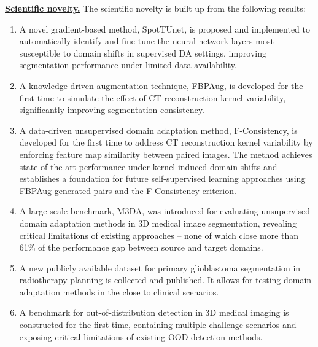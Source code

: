 \underline{\textbf{Scientific novelty.}}
The scientific novelty is built up from the following results:

\begin{enumerate}
	
	\item A novel gradient-based method, SpotTUnet, is proposed and implemented to automatically identify and fine-tune the neural network layers most susceptible to domain shifts in supervised DA settings, improving segmentation performance under limited data availability.
	
	\item A knowledge-driven augmentation technique, FBPAug, is developed for the first time to simulate the effect of CT reconstruction kernel variability, significantly improving segmentation consistency.
	
	\item A data-driven unsupervised domain adaptation method, F-Consistency, is developed for the first time to address CT reconstruction kernel variability by enforcing feature map similarity between paired images. The method achieves state-of-the-art performance under kernel-induced domain shifts and establishes a foundation for future self-supervised learning approaches using FBPAug-generated pairs and the F-Consistency criterion.
	
	\item A large-scale benchmark, M3DA, was introduced for evaluating unsupervised domain adaptation methods in 3D medical image segmentation, revealing critical limitations of existing approaches -- none of which close more than 61\% of the performance gap between source and target domains.
	
	\item A new publicly available dataset for primary glioblastoma segmentation in radiotherapy planning is collected and published. It allows for testing domain adaptation methods in the close to clinical scenarios.
	
	\item A benchmark for out-of-distribution detection in 3D medical imaging is constructed for the first time, containing multiple challenge scenarios and exposing critical limitations of existing OOD detection methods.
	
\end{enumerate}

